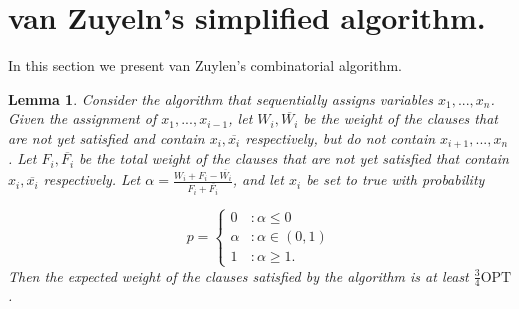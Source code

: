 \documentclass[11pt,letter]{article}
\newtheorem{lemma}{Lemma}
\begin{document}
\section{van Zuyeln's simplified algorithm.}

In this section we present van Zuylen's combinatorial algorithm.

\begin{lemma}
Consider the algorithm that sequentially assigns variables $x_1,...,x_n$. Given the assignment of $x_1,...,x_{i-1}$,
 let $W_i, \overline{W_i}$ be the weight of the clauses that are not yet satisfied and contain $x_i, \overline{x_i}$ respectively,
 but do not contain $x_{i+1}, ..., x_n$. Let $F_i, \overline{F_i}$ be the total weight of the clauses that are not yet satisfied
 that contain $x_i, \overline{x_i}$ respectively. Let $\alpha = \frac{W_i + F_i - \overline{W_i}}{F_i + \overline{F_i}}$, and let $x_i$ be set to true with probability

\begin{displaymath}
  p = \left\{
     \begin{array}{lr}
       0 & : \alpha \leq 0\\
       \alpha & : \alpha \in (0,1) \\
       1 & : \alpha \geq 1.
     \end{array}
   \right.
\end{displaymath}
Then the expected weight of the clauses satisfied by the algorithm is at least $\frac{3}{4} \text{OPT}$.
\end{lemma}
\end{document}
